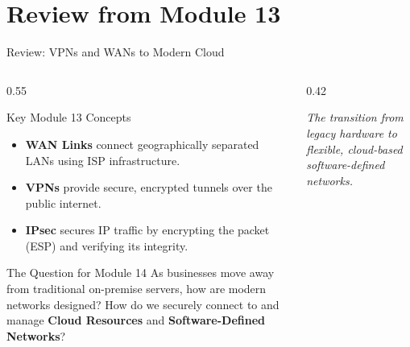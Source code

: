 \documentclass[aspectratio=169]{beamer}  %
\begin{document}
\section*{Review from Module 13}
\begin{frame}{Review: VPNs and WANs to Modern Cloud}
    \begin{columns}[T]
        \begin{column}{0.55\textwidth}
            \begin{block}{Key Module 13 Concepts}
                \begin{itemize}
                    \item \textbf{WAN Links} connect geographically separated LANs using ISP infrastructure.
                    \item \textbf{VPNs} provide secure, encrypted tunnels over the public internet.
                    \item \textbf{IPsec} secures IP traffic by encrypting the packet (ESP) and verifying its integrity.
                \end{itemize}
            \end{block}
            \vspace{0.3em}
            \begin{exampleblock}{The Question for Module 14}
                As businesses move away from traditional on-premise servers, how are modern networks designed? How do we securely connect to and manage \textbf{Cloud Resources} and \textbf{Software-Defined Networks}?
            \end{exampleblock}
        \end{column}
        \begin{column}{0.42\textwidth}
            \begin{center}
                \par\tiny\textit{The transition from legacy hardware to flexible, cloud-based software-defined networks.}
            \end{center}
        \end{column}
    \end{columns}
\end{frame}
\end{document}
